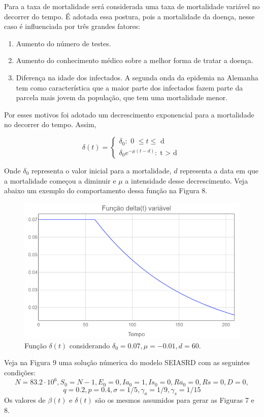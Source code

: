 \documentclass[12pt]{article}
\begin{document}
Para a taxa de mortalidade será considerada uma taxa de mortalidade variável no decorrer do tempo. É adotada essa postura, pois a mortalidade da doença, nesse caso é influenciada por três grandes fatores:
\begin{enumerate}
    \item Aumento do número de testes.
    \item Aumento do conhecimento médico sobre a melhor forma de tratar a doença.
    \item Diferença na idade dos infectados. A segunda onda da epidemia na Alemanha tem como característica que a maior parte dos infectados fazem parte da parcela mais jovem da população, que tem uma mortalidade menor.
\end{enumerate}
Por esses motivos foi adotado um decrescimento exponencial para a mortalidade no decorrer do tempo. Assim, 
\begin{center}
$$
\delta(t) = 
    \begin{cases}
    \delta_0: \text{ 0  $\leq t \leq $ d }\\
    \delta_0 e^{-\mu (t - d)}: \text{t $>$ d}
    \end{cases}
$$
\end{center}
Onde $\delta_0$ representa o valor inicial para a mortalidade, $d$ representa a data em que a mortalidade começou a diminuir e $\mu$ a intensidade desse decrescimento. Veja abaixo um exemplo do comportamento dessa função na Figura 8.

\begin{figure}[h]
\begin{center}
    \includegraphics[scale = 0.5]{delta(t).png}
    \caption{Função $\delta(t)$ considerando $\delta_0 = 0.07, \mu = -0.01, d = 60$.}
\end{center}
\end{figure}
Veja na Figura 9 uma solução númerica do modelo SEIASRD com as seguintes condições:
$$N = 83.2 \cdot 10^6, S_0 = N - 1, E_0 = 0,Ia_0 = 1, Is_0 = 0, Ra_0 = 0, Rs = 0, D = 0,$$
$$ q = 0.2, p = 0.4, \sigma = 1/5, \gamma_a = 1/9, \gamma_s = 1/15 $$
Os valores de $\beta(t)$ e $\delta(t)$ são os mesmos assumidos para gerar as Figuras 7 e 8.
\end{document}
